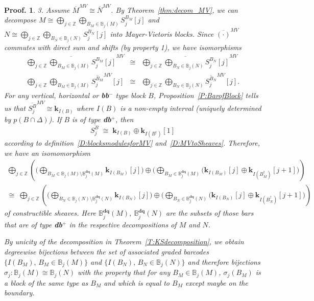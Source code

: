 \documentclass[a4paper, english, 11pt]{article}
\newcommand{\kk}[0]{\textbf{k}}
\newcommand{\0}{\vec{0}}
\newcommand{\Z}[0]{\mathbb{Z}}
\newtheorem*{pf}{Proof.} }
\begin{document}
\begin{pf}
3. Assume $\overline{M}^{MV} \cong \overline{N}^{MV}$. By Theorem~\ref{thm:decom_MV}, we can decompose 
$M\cong \bigoplus_{j\in \Z} \bigoplus_{B_M \in \mathbb{B}_j(M)}S_j^{B_M}[j]$ and 
$N \cong  \bigoplus_{j\in \Z} \bigoplus_{B_N \in \mathbb{B}_j(N)}S_j^{B_N}[j]$ into  Mayer-Vietoris blocks.
Since $\overline{(\cdot)}^{MV}$ commutes with direct 
sum and shifts (by property 1),  we have isomorphisms
\begin{eqnarray*}
 \overline{ \bigoplus_{j\in \Z} \bigoplus_{B_M\in \mathbb{B}_j(M)}S_j^{B_M}[j]}^{MV} &\cong&
 \overline{\bigoplus_{j\in \Z} \bigoplus_{B_N\in \mathbb{B}_j(N)}S_j^{B_N}[j] }^{MV}  \\ 
 \bigoplus_{j\in \Z} \bigoplus_{B_M\in \mathbb{B}_j(M)} \overline{S_j^{B_M}}^{MV}[j] &\cong& 
 \bigoplus_{j\in \Z} \bigoplus_{B_N\in \mathbb{B}_j(N)} \overline{S_j^{B_N} }^{MV}[j].
\end{eqnarray*}
For any vertical, horizontal or \textbf{bb}$^-$ type block $B$, Proposition~\ref{P:BarofBlock} tells us that  
$\overline{S_j^{B}}^{MV} \cong \kk_{I(B)}$ where $I(B)$ is a non-empty interval (uniquely determined by $p(B\cap \Delta)$). 
If $B$ is of type \textbf{db}$^{+}$, then 
$$
 \overline{S_j^{B}} \; \cong \;  \kk_{I(B)} \oplus \kk_{I(B^\dag)}[1]
$$
according to definition~\ref{D:blocksmodulesforMV} and~\ref{D:MVtoSheaves}.  
Therefore, we have an isomomorphism 
\begin{multline}
 \label{eq:decofBarMV}  
 \bigoplus_{j\in \Z} \left(\Big(\bigoplus_{B_M\in \mathbb{B}_j(M)\setminus \mathbb{B}^{\textbf{dq}}_j(M)} \kk_{I(B_M)}[j] \Big) \oplus 
 \Big(\bigoplus_{B_M\in \mathbb{B}^{\textbf{dq}}_j(M) } \big(\kk_{I(B_M)}[j] \oplus \kk_{I(B_M^\dag)}[j+1]\Big)\right)\\
 \cong \; 
 \bigoplus_{j\in \Z} \left(\Big(\bigoplus_{B_N\in \mathbb{B}_j(N) \setminus \mathbb{B}^{\textbf{dq}}_j(N)} \kk_{I(B_N)}[j]\Big)\oplus 
\Big( \bigoplus_{B_N\in \mathbb{B}^{\textbf{dq}}_j(N) } \big(\kk_{I(B_N)}[j] \oplus \kk_{I(B_N^\dag)}[j+1]\Big)\right)   
\end{multline}
of constructible sheaves. Here $\mathbb{B}^{\textbf{dq}}_j(M)$, $\mathbb{B}^{\textbf{dq}}_j(N) $ are the subsets of those bars that are of type \textbf{db}$^{+}$ in the respective decompositions of $M$ and $N$. 

By unicity of the decomposition in Theorem~\ref{T:KSdecomposition}, we obtain  degreewise bijections between 
the set of associated graded barcodes $\{ I(B_M), \, B_M \in  \mathbb{B}_j(M)\}$ and $\{ I(B_N), \, B_N \in  \mathbb{B}_j(N)\}$
and therefore  bijections $\sigma_j: \mathbb{B}_j(M) \cong \mathbb{B}_j(N)$ with the property that  for any $B_M\in \mathbb{B}_j(M)$, 
$\sigma_j(B_M)$ is a block of the same type as $B_M$ and which is equal to $B_M$ except maybe on the boundary.




\end{pf}
\end{document}
